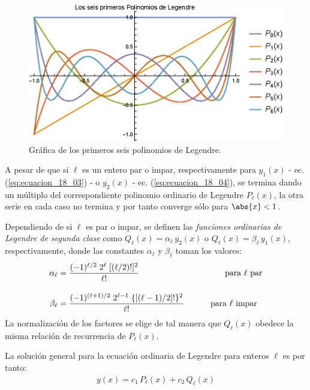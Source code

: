 \begin{figure}[H]
    \centering
    \includegraphics[scale=1.2]{Imagenes/Plot_Lagrange_0-6.eps}
    \caption{Gráfica de los primeros seis polinomios de Legendre.}
    \label{fig:polinomios_Lagrange_01}
\end{figure}
A pesar de que si $\ell$ es un entero par o impar, respectivamente para $y_{1}(x)$ - ec. (\ref{eq:ecuacion_18_03}) - o $y_{2}(x)$ - ec. (\ref{eq:ecuacion_18_04}), se termina dando un múltiplo del correspondiente polinomio ordinario de Legendre $P_{\ell}(x)$, la otra serie en cada caso no termina y por tanto converge sólo para $\abs{x} < 1$.
\par
Dependiendo de si $\ell$ es par o impar, se definen las \emph{funciones ordinarias de Legendre de segunda clase} como $Q_{\ell} (x) =  \alpha_{\ell} \, y_{2} (x)$ o $Q_{\ell} (x) =  \beta_{\ell} \, y_{1} (x)$, respectivamente, donde las constantes $\alpha_{\ell}$ y $\beta_{\ell}$ toman los valores:
\begin{align}
\alpha_{\ell} &= \dfrac{(-1)^{\ell/2} \; 2^{\ell} \; [(\ell / 2)!]^{2}}{\ell!} \hspace{3.5cm} \mbox{ para $\ell$ par} \label{eq:ecuacion_18_05}\\[1em]
\beta_{\ell} &= \dfrac{(-1)^{(\ell + 1)/2} \; 2^{\ell - 1} \; \lbrace \left[ (\ell - 1) /2 \right] ! \rbrace^{2}}{\ell!} \hspace{1cm} \mbox{ para $\ell$ impar} \label{eq:ecuacion_18_06}
\end{align}
La normalización de los factores se elige de tal manera que $Q_{\ell} (x)$ obedece la misma relación de recurrencia de $P_{\ell} (x)$.
\par
La solución general para la ecuación ordinaria de Legendre para enteros $\ell$ es por tanto:
\begin{align}
y(x) = c_{1} \, P_{\ell} (x) + c_{2} \, Q_{\ell} (x) 
\label{eq:ecuacion_18_07}
\end{align}
